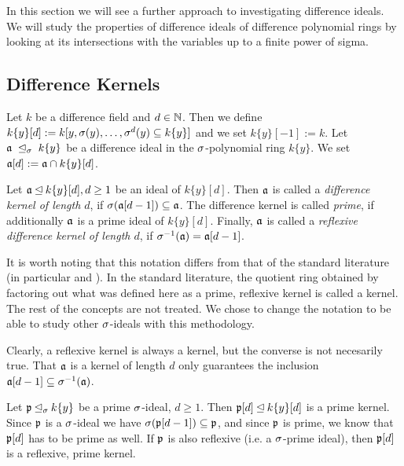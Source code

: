 In this section we will see a further approach to investigating difference ideals. We will study the properties of difference ideals of difference polynomial rings by looking at its intersections with the variables up to a finite power of sigma.

\subsection{Difference Kernels}


\begin{defn}
Let $k$ be a difference field and $d \in \mathbb{N}$. Then we define $k\{y\}[d]:= k[y,\sigma(y),\ldots,\sigma^d(y) \subseteq k\{y\}]$ and we set $k\{y\}[-1] := k$. Let $\mathfrak{a}~\unlhd_{\sigma}~k\{y\}$ be a difference ideal in the $\sigma$-polynomial ring $k\{y\}$. 
We set $\mathfrak{a}[d] := \mathfrak{a} \cap k\{y\}[d]$.
\end{defn}


\begin{defn}
Let $\mathfrak{a} \unlhd k\{y\}[d], d \geq 1$ be an ideal of $k\{y\}[d]$. Then $\mathfrak{a}$ is called a \emph{difference kernel of length $d$}, if $\sigma(\mathfrak{a}[d-1]) \subseteq \mathfrak{a}$. The difference kernel is called \emph{prime}, if additionally $\mathfrak{a}$ is a prime ideal of $k\{y\}[d]$.
Finally, $\mathfrak{a}$ is called a \emph{reflexive difference kernel of length $d$}, if $\sigma^{-1}(\mathfrak{a}) = \mathfrak{a}[d-1]$.   
\end{defn}

It is worth noting that this notation differs from that of the standard literature (in particular \cite{cohn} and \cite{levin}). In the standard literature, the quotient ring obtained by factoring out 
what was defined here as a prime, reflexive kernel is called a kernel. The rest of the concepts are not treated. We chose to change the notation to be able to study other $\sigma$-ideals with this methodology.

\begin{rem}
Clearly, a reflexive kernel is always a kernel, but the converse is not necesarily true. That $\mathfrak{a}$ is a kernel of length $d$ only guarantees the inclusion $\mathfrak{a}[d-1] \subseteq \sigma^{-1}(\mathfrak{a})$.
\end{rem}

\begin{ex}
Let $\mathfrak{p} \unlhd_{\sigma} k\{y\}$ be a prime $\sigma$-ideal, $d \geq 1$. Then $\mathfrak{p}[d] \unlhd k\{y\}[d]$ is a prime kernel. Since $\mathfrak{p}$ is a $\sigma$-ideal we have $\sigma(\mathfrak{p}[d-1]) \subseteq \mathfrak{p}$, 
and since $\mathfrak{p}$ is prime, we know that $\mathfrak{p}[d]$ has to be prime as well. If $\mathfrak{p}$ is also reflexive (i.e. a $\sigma$-prime ideal), then $\mathfrak{p}[d]$ is a reflexive, prime kernel. 
\end{ex}

